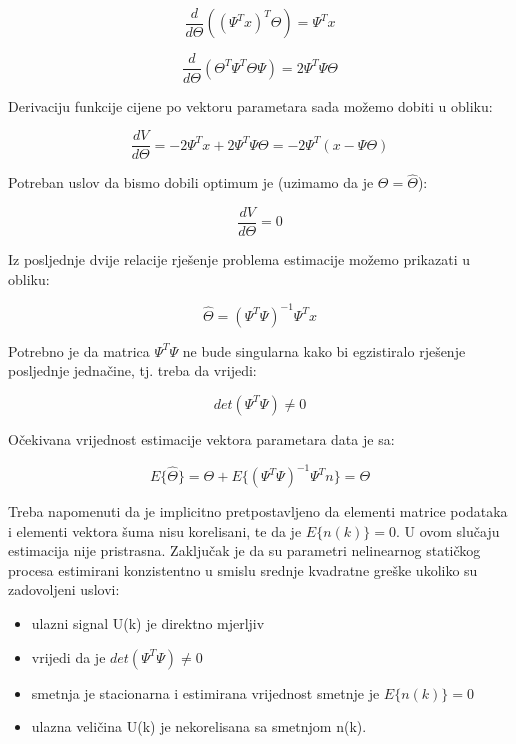 \begin{equation}
    \frac{d}{d\Theta}((\Psi ^T x)^T \Theta)=\Psi ^T x
\end{equation}

\begin{equation}
    \frac{d}{d\Theta}(\Theta ^T \Psi ^T \Theta \Psi)=2 \Psi ^T \Psi \Theta
\end{equation}

Derivaciju funkcije cijene po vektoru parametara sada možemo dobiti u obliku: 

\begin{equation}
    \frac{dV}{d\Theta}=-2\Psi ^Tx + 2\Psi ^T \Psi \Theta = -2 \Psi ^T (x- \Psi \Theta)
\end{equation}

Potreban uslov da bismo dobili optimum je (uzimamo da je $\Theta=\hat{\Theta}$): 

\begin{equation}
    \frac{dV}{d\Theta} = 0
\end{equation}

Iz posljednje dvije relacije rješenje problema estimacije možemo prikazati u obliku: 

\begin{equation}
    \hat{\Theta}=(\Psi ^T \Psi)^{-1} \Psi ^T x
    \label{eq:lsm}
\end{equation}

Potrebno je da matrica $\Psi ^T \Psi$ ne bude singularna kako bi egzistiralo rješenje posljednje jednačine, tj. treba da vrijedi:

\begin{equation}
    det(\Psi ^T \Psi) \neq 0
\end{equation}

Očekivana vrijednost  estimacije vektora parametara data je sa:

\begin{equation}
    E\{\hat{\Theta}\}= \Theta + E \{(\Psi ^T \Psi) ^{-1} \Psi ^T n\} = \Theta
\end{equation}

Treba napomenuti da je implicitno pretpostavljeno da elementi matrice podataka i elementi vektora šuma nisu korelisani, te da je $E\{n(k)\}=0$. U ovom slučaju estimacija nije pristrasna. Zaključak je da su parametri nelinearnog statičkog procesa estimirani konzistentno u smislu srednje kvadratne greške ukoliko su zadovoljeni uslovi: 
\begin{itemize}
    \item ulazni signal U(k) je direktno mjerljiv
    \item vrijedi da je $det(\Psi ^T \Psi) \neq 0$
    \item smetnja je stacionarna i estimirana vrijednost smetnje je $E\{n(k)\}=0$
    \item ulazna veličina U(k) je nekorelisana sa smetnjom n(k). \cite{treca}
\end{itemize} 

